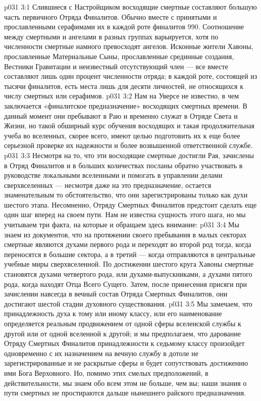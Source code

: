 \vs p031 3:1 Слившиеся с Настройщиком восходящие смертные составляют большую часть первичного Отряда Финалитов. Обычно вместе с принятыми и прославленными серафимами их в каждой роте финалитов 990. Соотношение между смертными и ангелами в разных группах варьируется, хотя по численности смертные намного превосходят ангелов. Исконные жители Хавоны, прославленные Материальные Сыны, прославленные срединные создания, Вестники Гравитации и неизвестный отсутствующий член --- все вместе составляют лишь один процент численности отряда; в каждой роте, состоящей из тысячи финалитов, есть места лишь для десяти личностей, не относящихся к числу смертных или серафимов.
\vs p031 3:2 Нам на Уверсе не известно, в чем заключается «финалитское предназначение» восходящих смертных времени. В данный момент они пребывают в Раю и временно служат в Отряде Света и Жизни, но такой обширный курс обучения восходящих и такая продолжительная учеба во вселенных, скорее всего, имеют целью подготовить их к еще более серьезной проверке их надежности и более возвышенной ответственной службе.
\vs p031 3:3 \pc Несмотря на то, что эти восходящие смертные достигли Рая, зачислены в Отряд Финалитов и в больших количествах посланы обратно участвовать в руководстве локальными вселенными и помогать в управлении делами сверхвселенных --- несмотря даже на это  предназначение, остается знаменательным то обстоятельство, что они зарегистрированы только как духи шестого этапа. Несомненно, Отряду Смертных Финалитов предстоит сделать еще один шаг вперед на своем пути. Нам не известна сущность этого шага, но мы учитываем три факта, на которые и обращаем здесь внимание:
\vs p031 3:4 \pc {}\bibnobreakspace Мы знаем из документов, что на протяжении своего пребывания в малых секторах смертные являются духами первого рода и переходят во второй род тогда, когда переносятся в большие сектора, а в третий --- когда отправляются в центральные учебные миры сверхвселенной. По достижении шестого круга Хавоны смертные становятся духами четвертого рода, или духами\hyp{}выпускниками, а духами пятого рода, когда находят Отца Всего Сущего. Затем, после принесения присяги при зачислении навсегда в вечный состав Отряда Смертных Финалитов, они достигают шестой стадии духовного существования.
\vs p031 3:5 Мы замечаем, что принадлежность духа к тому или иному классу, или его наименование определяется реальным продвижением от одной сферы вселенской службы к другой или от одной вселенной к другой; и мы предполагаем, что дарование Отряду Смертных Финалитов принадлежности к седьмому классу произойдет одновременно с их назначением на вечную службу в дотоле не зарегистрированные и не раскрытые сферы и будет сопутствовать достижению ими Бога Верховного. Но, помимо этих смелых предположений, в действительности, мы знаем обо всем этом не больше, чем вы; наши знания о пути смертных не простираются дальше нынешнего райского предназначения.
